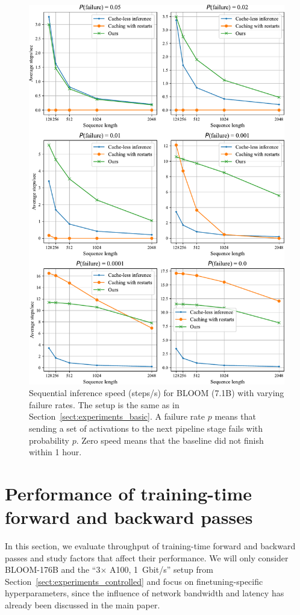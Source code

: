 \begin{figure}[H]
    \centering
    \includegraphics[width=0.875 \linewidth]{resources/pretty_failure_rate_plots.pdf}
    \caption{Sequential inference speed (steps/s) for BLOOM (7.1B) with varying failure rates. The setup is the same as in Section~\ref{sect:experiments_basic}. A failure rate $p$ means that sending a set of activations to the next pipeline stage fails with probability $p$. Zero speed means that the baseline did not finish within 1 hour.}
    \label{fig:failure_rate_plots}
\end{figure}

\section{Performance of training-time forward and backward passes}\label{appendix:backward_pass}

In this section, we evaluate throughput of training-time forward and backward passes and study factors that affect their performance. We will only consider BLOOM-176B and the ``3$\times$ A100, 1~Gbit/s'' setup from Section~\ref{sect:experiments_controlled} and focus on finetuning-specific hyperparameters, since the influence of network bandwidth and latency has already been discussed in the main paper.

